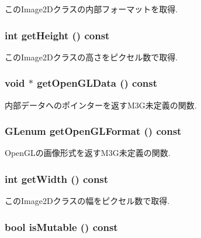 このImage2Dクラスの内部フォーマットを取得. \hypertarget{classm3g_1_1Image2D_317329daf960a1759801c0f16d43d5a3}{
\subsubsection[{getHeight}]{\setlength{\rightskip}{0pt plus 5cm}int getHeight () const}}
\label{classm3g_1_1Image2D_317329daf960a1759801c0f16d43d5a3}


このImage2Dクラスの高さをピクセル数で取得. \hypertarget{classm3g_1_1Image2D_b837b1bdda59947a6d818c448965c502}{
\subsubsection[{getOpenGLData}]{\setlength{\rightskip}{0pt plus 5cm}void $\ast$ getOpenGLData () const}}
\label{classm3g_1_1Image2D_b837b1bdda59947a6d818c448965c502}


内部データへのポインターを返すM3G未定義の関数. \hypertarget{classm3g_1_1Image2D_7923da2fe82fee768ec9937a693e843c}{
\subsubsection[{getOpenGLFormat}]{\setlength{\rightskip}{0pt plus 5cm}GLenum getOpenGLFormat () const}}
\label{classm3g_1_1Image2D_7923da2fe82fee768ec9937a693e843c}


OpenGLの画像形式を返すM3G未定義の関数. \hypertarget{classm3g_1_1Image2D_f149cb053bc8b5fbc1364b5dbb934488}{
\subsubsection[{getWidth}]{\setlength{\rightskip}{0pt plus 5cm}int getWidth () const}}
\label{classm3g_1_1Image2D_f149cb053bc8b5fbc1364b5dbb934488}


このImage2Dクラスの幅をピクセル数で取得. \hypertarget{classm3g_1_1Image2D_d687aabba553d1c66bfc253ec7e5bd05}{
\subsubsection[{isMutable}]{\setlength{\rightskip}{0pt plus 5cm}bool isMutable () const}}
\label{classm3g_1_1Image2D_d687aabba553d1c66bfc253ec7e5bd05}


